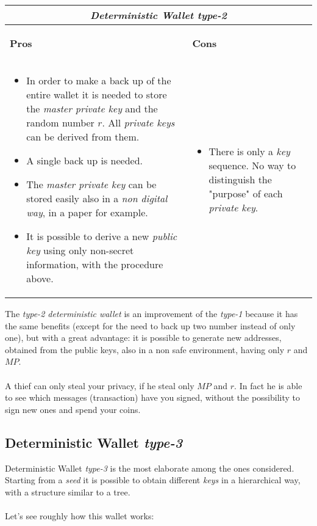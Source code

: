 \begin{center}
	\begin{tabular}{ |p{6cm}|p{6cm}|  }
		\hline
		\multicolumn{2}{|c|}{\textbf{\textit{Deterministic Wallet type-2}}} \\
		\hline \hline 
		\begin{center}
			\textbf{Pros}
		\end{center}&\begin{center}
			\textbf{Cons}
		\end{center}\\
		\hline
		\begin{itemize}
			\item In order to make a back up of the entire wallet it is needed to store the \textit{master private key} and the random number $r$. All \textit{private keys} can be derived from them.
			\item A single back up is needed.
			\item The \textit{master private key} can be stored easily also in a \textit{non digital way}, in a paper for example.
			\item It is possible to derive a new \textit{public key} using only non-secret information, with the procedure above.
		\end{itemize} &
		\begin{itemize}
			\item There is only a \textit{key} sequence. No way to distinguish the "purpose" of each \textit{private key}.
		\end{itemize}\\
		\hline
	\end{tabular}
\end{center}
The \textit{type-2 deterministic wallet} is an improvement of the \textit{type-1} because it has the same benefits (except for the need to back up two number instead of only one), but with a great advantage: it is possible to generate new addresses, obtained from the public keys, also in a non safe environment, having only $r$ and $MP$. 
\\ \\
A thief can only steal your privacy, if he steal only $MP$ and $r$. In fact he is able to see which messages (transaction) have you signed, without the possibility to sign new ones and spend your coins.

\subsection{Deterministic Wallet \textit{type-3}}
Deterministic Wallet \textit{type-3} is the most elaborate among the ones considered. Starting from a \textit{seed} it is possible to obtain different \textit{keys} in a hierarchical way, with a structure similar to a tree. 
\\ \\
Let's see roughly how this wallet works:

